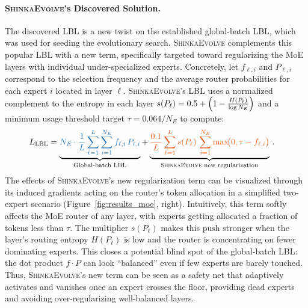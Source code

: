 \documentclass[11pt, a4paper]{include/gdm_format}
\newcommand{\ouralgo}{\textsc{ShinkaEvolve}\xspace}
\begin{document}
\paragraph{\ouralgo's Discovered Solution.} The discovered LBL is a new twist on the established global-batch LBL, which was used for seeding the evolutionary search. \ouralgo complements this popular LBL with a new term, specifically targeted toward regularizing the MoE layers with individual under-specialized experts. Concretely, let $f_{\ell, i}$ and $P_{\ell, i}$ correspond to the selection frequency and the average router probabilities for each expert $i$ located in layer $\ell$. \ouralgo's LBL uses a normalized complement to the entropy in each layer $s(P_\ell)=0.5 + \Bigl(1-\frac{H(P_\ell)}{\log N_E}\Bigr)$ and a minimum usage threshold target $\tau = 0.064/{N_E}$ to compute:
\begin{equation}
\label{eq:discovered_lbl_colored}
\begin{aligned}
L_{\mathrm{LBL}}
&=
\underbrace{
\color{lblA} N_E \cdot \frac{1}{L}
\sum_{\ell=1}^{L}\sum_{i=1}^{N_E} f_{\ell,i}\,P_{\ell,i}
}_{\text{Global-batch LBL}}+
\underbrace{
\color{lblB} \frac{0.1}{L}\sum_{\ell=1}^{L}
s(P_\ell)\,\sum_{i=1}^{N_E}\max\!\bigl(0,\tau-f_{\ell,i}\bigr)
}_{\text{\ouralgo new regularization}} \, .
\end{aligned}
\end{equation}
The effects of \ouralgo's new regularization term can be visualized through its induced gradients acting on the router's token allocation in a simplified two-expert scenario (Figure~\ref{fig:results_moe}, right). Intuitively, this term softly affects the MoE router of any layer, with experts getting allocated a fraction of tokens less than $\tau$. The multiplier $s(P_\ell)$ makes this push stronger when the layer's routing entropy $H(P_\ell)$ is low and the router is concentrating on fewer dominating experts. This closes a potential blind spot of the global-batch LBL: the dot product $f\!\cdot\!P$ can look ``balanced'' even if few experts are barely touched. Thus, \ouralgo's new term can be seen as a safety net that adaptively activates and vanishes once an expert crosses the floor, providing dead experts and avoiding over-regularizing well-balanced layers.
\end{document}
